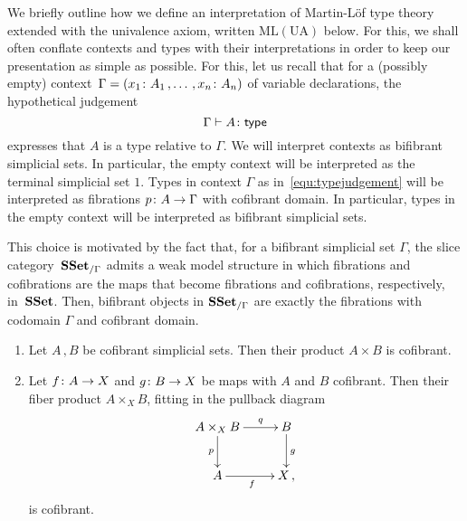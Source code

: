 \documentclass[reqno,10pt,a4paper,oneside,draft]{amsart}
\begin{document}
We briefly outline how we define an interpretation of Martin-L\"of type theory 
extended with the univalence axiom, written $\mathrm{ML(UA)}$ below. For this, 
we shall often conflate contexts and types with their interpretations in order to keep our presentation as simple as possible. For this, let us recall that for a  (possibly empty) context~$\Gamma = (x_1 \colon A_1 \, , \ldots \, , x_n \colon A_n)$ of variable declarations, the hypothetical judgement
\begin{equation}
\label{equ:typejudgement}
\Gamma \vdash A \colon \mathsf{type} 
 \end{equation} 
expresses that $A$ is a type relative to $\Gamma$. We will interpret contexts as bifibrant simplicial sets. In particular,
the empty context will be interpreted as the terminal simplicial set $1$.  Types in context $\Gamma$ as in~\eqref{equ:typejudgement} will be interpreted as fibrations $p \colon A \to \Gamma$ with cofibrant domain. In particular, types in the empty context will be interpreted as
bifibrant simplicial sets. 

\medskip
 
This choice is motivated by the fact that, for a bifibrant simplicial set $\Gamma$, the slice category~$\mathbf{SSet}_{/\Gamma}$ admits a weak model structure in which fibrations and cofibrations are the maps that become fibrations and cofibrations, respectively, in~$\mathbf{SSet}$. Then, bifibrant objects in $\mathbf{SSet}_{/\Gamma}$
are exactly the fibrations with codomain $\Gamma$ and cofibrant domain.














\begin{proposition}\label{lem:cofibrant_fiber_product} \hfill 
\begin{enumerate}[$(i)$] 
\item Let $A \, , B$ be cofibrant simplicial sets. Then their product $A \times B$ is cofibrant.
\item Let $f \colon A \to X$ and $g \colon B \to X$ be maps with $A$ and $B$ cofibrant. Then their
fiber product $A \times_X B$, fitting in the pullback diagram
\[
\xymatrix{
A \times_X B \ar[r]^-{q} \ar[d]_-{p} & B \ar[d]^g \\
A \ar[r]_f & X \, ,}
\]
is cofibrant.
\end{enumerate}
\end{proposition}
\end{document}
